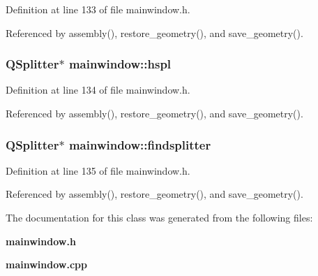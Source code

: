 Definition at line 133 of file mainwindow.h.

Referenced by assembly(), restore\_\-geometry(), and save\_\-geometry().
\subsubsection{\setlength{\rightskip}{0pt plus 5cm}QSplitter$\ast$ {\bf mainwindow::hspl}\hspace{0.3cm}{\tt  [private]}}\label{classmainwindow_8b5d623b46b8e181a5152b503d055b54}




Definition at line 134 of file mainwindow.h.

Referenced by assembly(), restore\_\-geometry(), and save\_\-geometry().
\subsubsection{\setlength{\rightskip}{0pt plus 5cm}QSplitter$\ast$ {\bf mainwindow::findsplitter}\hspace{0.3cm}{\tt  [private]}}\label{classmainwindow_432d81c9fadef4dd528d86c0e9135600}




Definition at line 135 of file mainwindow.h.

Referenced by assembly(), restore\_\-geometry(), and save\_\-geometry().

The documentation for this class was generated from the following files:\begin{CompactItemize}
\item 
{\bf mainwindow.h}\item 
{\bf mainwindow.cpp}\end{CompactItemize}
